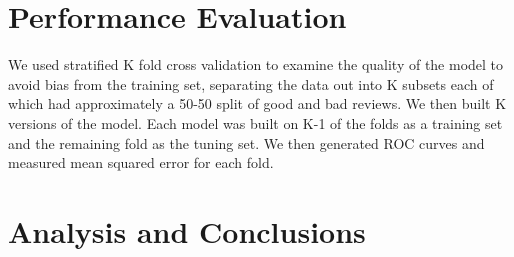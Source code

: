 \documentclass[]{article}
\begin{document}
\begin{multicols}{2}
\section{Performance Evaluation}

We used stratified K fold cross validation to examine the quality of the model to avoid bias from the training set, separating the data out into K subsets each of which had approximately a 50-50 split of good and bad reviews. We then built K versions of the model. Each model was built on K-1 of the folds as a training set and the remaining fold as the tuning set. We then generated ROC curves and measured mean squared error for each fold.

\section{Analysis and Conclusions}

\end{multicols}
\end{document}
